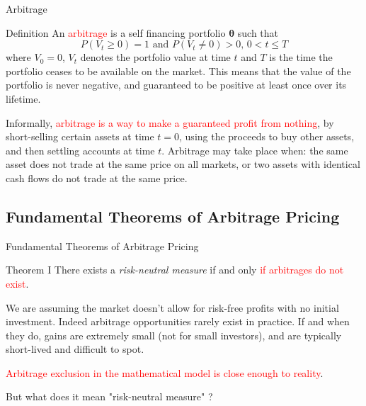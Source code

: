 \documentclass{beamer}
\begin{document}
\begin{frame}{Arbitrage}
	\begin{block}{Definition}
		An \textcolor{red}{arbitrage} is a self financing portfolio $\mathbf{\theta}$ such that
		\begin{equation}
		P(V_{t}\geq 0)=1{\text{ and }}P(V_{t}\neq 0)>0,\,0<t\leq T
		\end{equation}
		where $V_0=0$, $V_t$ denotes the portfolio value at time $t$ and $T$ is the time the portfolio ceases to be available on the market. This means that the value of the portfolio is never negative, and guaranteed to be positive at least once over its lifetime.
	\end{block}
    \pause
	Informally, \textcolor{red}{arbitrage is a way to make a guaranteed profit from nothing}, by short-selling certain assets at time $t = 0$, using the proceeds to buy other assets, and then settling accounts at time $t$. 
	\small{Arbitrage may take place when: the same asset does not trade at the same price on all markets, or two assets with identical cash flows do not trade at the same price}.
\end{frame}

\subsection{Fundamental Theorems of Arbitrage Pricing}
\begin{frame}{Fundamental Theorems of Arbitrage Pricing}
	\begin{block}{Theorem I}
		There exists a \emph{risk-neutral measure} if and only \textcolor{red}{if arbitrages do not exist}.
	\end{block}
	\pause
	\vspace{1cm}
    We are assuming the market doesn't allow for risk-free profits with no initial investment.
    Indeed arbitrage opportunities rarely exist in practice. If and when they do, gains are extremely small (not for small investors), and are typically short-lived and difficult to spot. 
    
	\textcolor{red}{Arbitrage exclusion in the mathematical model is close enough to reality}.
	
	\pause
	But what does it mean "risk-neutral measure" ?
\end{frame}
\end{document}
